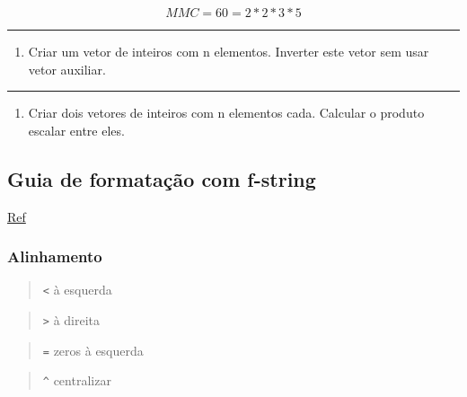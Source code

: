 \documentclass[12pt,a4paper]{article}
\renewcommand{\linethickness}{0.05em}
\providecommand{\tightlist}{%
      \setlength{\itemsep}{0pt}\setlength{\parskip}{0pt}}
\begin{document}
\[MMC = 60 = 2*2*3*5\]

    \begin{center}\rule{0.5\linewidth}{\linethickness}\end{center}

\begin{enumerate}
\def\labelenumi{\arabic{enumi}.}
\setcounter{enumi}{3}
\tightlist
\item
  Criar um vetor de inteiros com n elementos. Inverter este vetor sem
  usar vetor auxiliar.
\end{enumerate}

    \begin{center}\rule{0.5\linewidth}{\linethickness}\end{center}

\begin{enumerate}
\def\labelenumi{\arabic{enumi}.}
\setcounter{enumi}{4}
\tightlist
\item
  Criar dois vetores de inteiros com n elementos cada. Calcular o
  produto escalar entre eles.
\end{enumerate}

    \hypertarget{guia-de-formatauxe7uxe3o-com-f-string}{%
\subsection{Guia de formatação com
f-string}\label{guia-de-formatauxe7uxe3o-com-f-string}}

\href{http://cis.bentley.edu/sandbox/wp-content/uploads/Documentation-on-f-strings.pdf}{Ref}

    \hypertarget{alinhamento}{%
\subsubsection{Alinhamento}\label{alinhamento}}

\begin{quote}
\texttt{\textless{}} à esquerda
\end{quote}

\begin{quote}
\texttt{\textgreater{}} à direita
\end{quote}

\begin{quote}
\texttt{=} zeros à esquerda
\end{quote}

\begin{quote}
\texttt{\^{}} centralizar
\end{quote}
\end{document}
